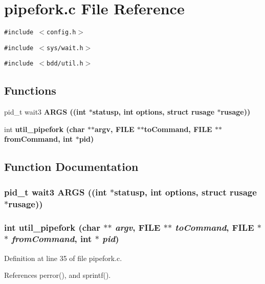\section{pipefork.c File Reference}
\label{pipefork_8c}
{\tt \#include $<$config.h$>$}\par
{\tt \#include $<$sys/wait.h$>$}\par
{\tt \#include $<$bdd/util.h$>$}\par
\subsection*{Functions}
\begin{CompactItemize}
\item 
pid\_\-t wait3 \bf{ARGS} ((int $\ast$statusp, int options, struct rusage $\ast$rusage))
\item 
int \bf{util\_\-pipefork} (char $\ast$$\ast$argv, FILE $\ast$$\ast$to\-Command, FILE $\ast$$\ast$from\-Command, int $\ast$pid)
\end{CompactItemize}


\subsection{Function Documentation}
\subsubsection{\setlength{\rightskip}{0pt plus 5cm}pid\_\-t wait3 ARGS ((int $\ast$statusp, int options, struct rusage $\ast$rusage))}\label{pipefork_8c_de7c6f741492678c7643c75833320887}


\subsubsection{\setlength{\rightskip}{0pt plus 5cm}int util\_\-pipefork (char $\ast$$\ast$ {\em argv}, FILE $\ast$$\ast$ {\em to\-Command}, FILE $\ast$$\ast$ {\em from\-Command}, int $\ast$ {\em pid})}\label{pipefork_8c_84bdd7ebd1c5c8857ff99d6ea1e4de8f}




Definition at line 35 of file pipefork.c.

References perror(), and sprintf().